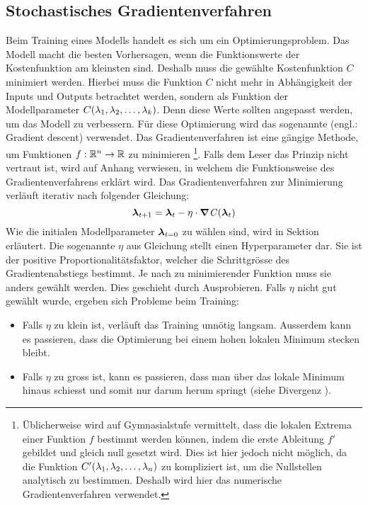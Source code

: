 \subsection{Stochastisches Gradientenverfahren}\label{sec:gradientenverfahren}
Beim Training eines Modells handelt es sich um ein Optimierungsproblem.
Das Modell macht die besten Vorhersagen, wenn die
Funktionswerte der Kostenfunktion am kleinsten sind.
Deshalb muss die gewählte Kostenfunktion $C$ minimiert werden.
Hierbei muss die Funktion $C$ nicht mehr in Abhängigkeit der Inputs und Outputs betrachtet
werden, sondern als Funktion der Modellparameter
$C(\lambda_1, \lambda_2, \ldots, \lambda_k)$. Denn diese Werte sollten angepasst
werden, um das Modell zu verbessern.
\para{}
Für diese Optimierung wird das sogenannte  (engl.: Gradient descent) verwendet.
Das Gradientenverfahren ist eine gängige Methode, um Funktionen $f: \mathbb{R}^n \to
\mathbb{R}$ zu minimieren%
\footnote{Üblicherweise wird auf Gymnasialstufe vermittelt, dass die lokalen
  Extrema einer Funktion $f$ bestimmt werden
  können, indem die erste Ableitung $f'$ gebildet und gleich null gesetzt
  wird. Dies ist hier jedoch nicht möglich, da die Funktion
  $C'(\lambda_1,\lambda_2,\ldots,\lambda_n)$ zu kompliziert ist, um die
  Nullstellen analytisch zu bestimmen. Deshalb wird hier das numerische Gradientenverfahren
  verwendet.
}.
Falls dem Leser das Prinzip nicht vertraut ist, wird auf Anhang
 verwiesen, in
welchem die Funktionsweise des Gradientenverfahrens erklärt wird.
\para{}
Das Gradientenverfahren zur Minimierung verläuft iterativ nach folgender
Gleichung:
\begin{equation}\label{eq:gd_ml}
  \bm{\lambda}_{t+1} = \bm{\lambda}_t - \eta \cdot \bm{\nabla} \mathit{C}(\bm{\lambda}_t)
\end{equation}
Wie die initialen Modellparameter $\bm{\lambda}_{t=0}$ zu wählen sind, wird in Sektion
 erläutert.
\para{}
Die sogenannte  $\eta$ aus Gleichung  stellt
einen Hyperparameter dar. Sie ist der positive Proportionalitätsfaktor, welcher die Schrittgrösse des
Gradientenabstiegs bestimmt.
Je nach zu minimierender Funktion muss sie anders gewählt werden.
Dies geschieht durch Ausprobieren. Falls $\eta$ nicht gut gewählt wurde, ergeben
sich Probleme beim Training:
\begin{itemize}
\item{Falls $\eta$ zu klein ist, verläuft das Training unnötig langsam.
    Ausserdem kann es passieren, dass die Optimierung bei einem hohen lokalen
    Minimum stecken bleibt.}

\item{Falls $\eta$ zu gross ist, kann es passieren, dass man über das lokale
    Minimum hinaus schiesst und somit nur darum herum springt (siehe Divergenz ).}
\end{itemize}

